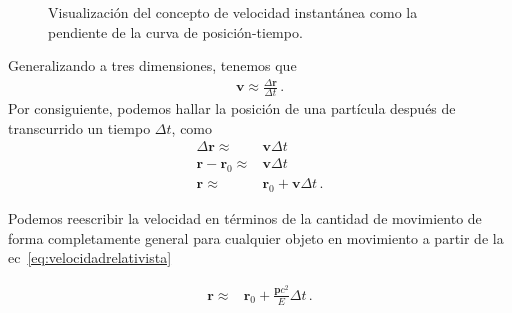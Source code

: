 \documentclass[11pt,a4paper]{book}
\begin{document}
\begin{figure}[h!]
\begin{minipage}{0.48\textwidth}
    \end{minipage}
    \caption{Visualización del concepto de velocidad instantánea como la pendiente de la curva de posición-tiempo.}
    \label{fig:velocidad_instantanea}
\end{figure}


Generalizando a tres dimensiones, tenemos que  
\begin{align}
\label{eq:velocity}
    \boldsymbol{v} \approx \frac{\Delta \boldsymbol{r}}{\Delta t}\,. 
\end{align}
Por consiguiente, podemos hallar la posición de una partícula después de transcurrido un tiempo  $\Delta t$, como
\begin{align}
    \Delta \boldsymbol{r} \approx& \boldsymbol{v}\Delta t\\
    \boldsymbol{r} -\boldsymbol{r}_0 \approx & \boldsymbol{v}\Delta t\\
    \boldsymbol{r} \approx& \boldsymbol{r}_0 + \boldsymbol{v}\Delta t\,.
\end{align}

Podemos reescribir la velocidad en términos de la cantidad de movimiento de forma completamente general para cualquier objeto en movimiento a partir de la ec~\eqref{eq:velocidadrelativista}

\begin{align}
    \boldsymbol{r} \approx& \boldsymbol{r}_0 + \frac{\boldsymbol{p}c^2}{E}\Delta t\,.
\end{align}
\end{document}
